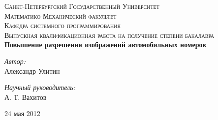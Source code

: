 \newenvironment{changemargin}[2]{
\begin{list}{}{
\setlength{\topsep}{0pt}
\setlength{\leftmargin}{#1}
\setlength{\rightmargin}{#2}
\setlength{\listparindent}{\parindent}
\setlength{\itemindent}{\parindent}
\setlength{\parsep}{\parskip}
}
\item[]}{\end{list}}


\begin{titlepage}
\begin{changemargin}{-2cm}{-2cm}

\begin{center}



\textsc{\large Санкт-Петербургский Государственный Университет \\[0.2cm]
Математико-Механический факультет\\
Кафедра системного программирования\\[1.5cm]}
\textsc{\large
Выпускная квалификационная работа на получение степени
бакалавра
}\\[2.5cm]


{ \huge \bfseries
Повышение разрешения изображений автомобильных номеров
}
\\[2.5cm]


\begin{minipage}{0.4\textwidth}
\begin{flushleft} \large
\emph{Автор:}\\
Александр Улитин
\end{flushleft}
\end{minipage}
\begin{minipage}{0.4\textwidth}
\begin{flushright} \large
\emph{Научный руководитель:} \\
А. Т. Вахитов
\end{flushright}
\end{minipage}

\vfill
{\large 24 мая 2012}

\end{center}

\end{changemargin}
\end{titlepage}
